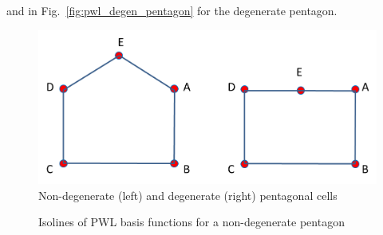 \documentclass[preprint,10pt]{elsarticle}
\newcommand{\fig}[1]{Fig.~\ref{#1}}                      %
\begin{document}
and in \fig{fig:pwl_degen_pentagon} for the degenerate pentagon.
%
\begin{figure}[!hbtp]
\centering
\includegraphics[scale=0.77]{pentagons.png}
\caption{Non-degenerate (left) and degenerate (right) pentagonal cells}
\label{fig:pentagons}
\end{figure}
%
%
\begin{figure}[!hbtp]
\centering
{}
\caption{Isolines of PWL basis functions for a non-degenerate pentagon}
\label{fig:pwl_pentagon}
\end{figure}
\end{document}
